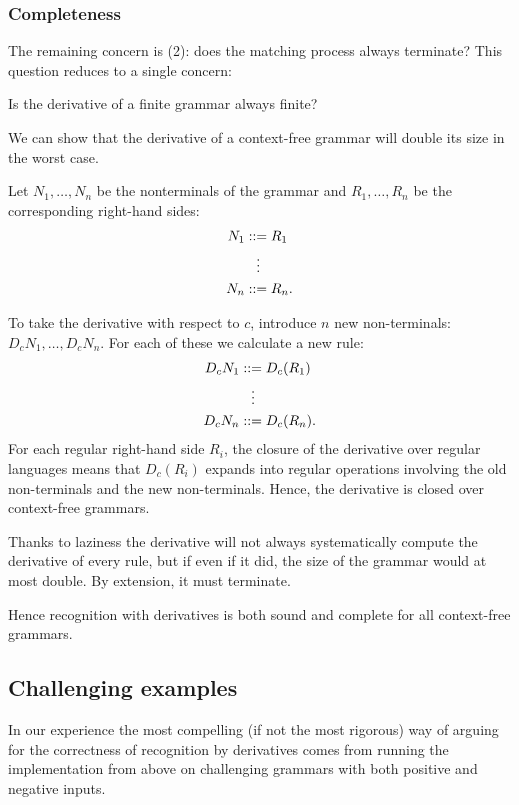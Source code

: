 \subsubsection{Completeness} 
%
The remaining concern is (2): does the matching process always terminate?
%
This question reduces to a single concern:
\begin{center}
 Is the derivative of a finite grammar always finite?
\end{center}
%
We can show that the derivative of a context-free grammar will 
double its size in the worst case.

Let $N_1,\ldots,N_n$ be the nonterminals of the grammar and $R_1,\ldots,R_n$
be the corresponding right-hand sides:
\begin{align*}
 N_1 &::= R_1
 \\
 &\;\;\;\vdots
 \\
 N_n &::= R_n
 \text.
\end{align*}

To take the derivative with respect to $c$, introduce $n$ new non-terminals:
$D_cN_1,\ldots,D_cN_n$.
%
For each of these we calculate a new rule:
\begin{align*}
 D_cN_1 &::= D_c(R_1)
 \\
 &\;\;\;\vdots
 \\
 D_cN_n &::= D_c(R_n)
 \text.
\end{align*}
%
For each regular right-hand side $R_i$, the closure of the derivative over
regular languages means that $D_c(R_i)$ expands into regular operations
involving the old non-terminals and the new non-terminals.
%
Hence, the derivative is closed over context-free grammars.

Thanks to laziness the derivative will not always systematically compute the
derivative of every rule, but if even if it did, the size of the grammar would
at most double. By extension, it must terminate.

Hence recognition with derivatives is both sound and complete for all
context-free grammars.


\subsection{Challenging examples}
%
In our experience the most compelling (if not the most rigorous) way of arguing
for the correctness of recognition by derivatives comes from running the
implementation from above on challenging grammars with both positive and
negative inputs.

